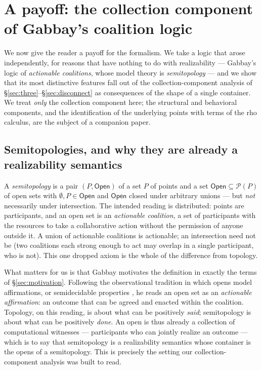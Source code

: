 \documentclass[11pt]{article}
\theoremstyle{definition}
\theoremstyle{plain}
\begin{document}
\section{A payoff: the collection component of Gabbay's coalition logic}
\label{sec:semitopology}

We now give the reader a payoff for the formalism. We take a logic that arose
independently, for reasons that have nothing to do with realizability ---
Gabbay's logic of \emph{actionable coalitions}, whose model theory is
\emph{semitopology} \cite{Gabbay25,GabbayLosa23,GabbaySemiframes,GabbayBook}
--- and we show that its most distinctive features fall out of the
collection-component analysis of \S\ref{sec:three}--\S\ref{sec:disconnect} as
consequences of the shape of a single container. We treat \emph{only} the
collection component here; the structural and behavioral components, and the
identification of the underlying points with terms of the rho calculus, are
the subject of a companion paper.

\subsection{Semitopologies, and why they are already a realizability
semantics}

A \emph{semitopology} \cite{Gabbay25} is a pair $(P,\mathsf{Open})$ of a set
$P$ of points and a set $\mathsf{Open}\subseteq \mathcal{P}(P)$ of open sets
with $\emptyset,P\in\mathsf{Open}$ and $\mathsf{Open}$ closed under arbitrary
unions --- but \emph{not} necessarily under intersection. The intended reading
is distributed: points are participants, and an open set is an
\emph{actionable coalition}, a set of participants with the resources to take
a collaborative action without the permission of anyone outside it. A union of
actionable coalitions is actionable; an intersection need not be (two coalitions
each strong enough to act may overlap in a single participant, who is not).
This one dropped axiom is the whole of the difference from topology.

What matters for us is that Gabbay motivates the definition in exactly the
terms of \S\ref{sec:motivation}. Following the observational tradition in which
opens model affirmations, or semidecidable properties \cite{Vickers89}, he
reads an open set as an \emph{actionable affirmation}: an outcome that can be
agreed and enacted within the coalition. Topology, on this reading, is about
what can be positively \emph{said}; semitopology is about what can be
positively \emph{done}. An open is thus already a collection of computational
witnesses --- participants who can jointly realize an outcome --- which is to
say that semitopology is a realizability semantics whose container is the opens
of a semitopology. This is precisely the setting our collection-component
analysis was built to read.
\end{document}

